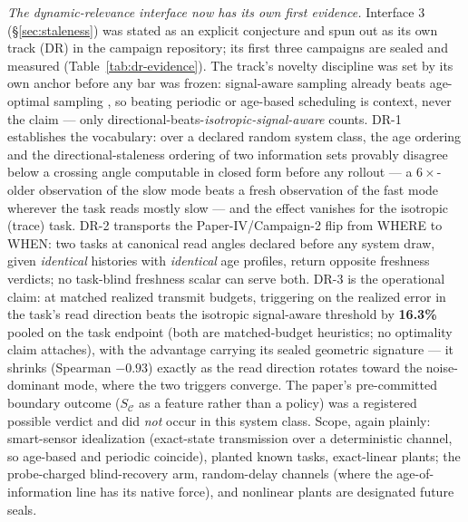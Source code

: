 \documentclass[letterpaper,onecolumn]{IEEEtran}
\theoremstyle{definition}
\theoremstyle{remark}
\newcommand{\SC}{S_{\mathcal{C}}}
\begin{document}
\emph{The dynamic-relevance interface now has its own first evidence.}
Interface 3 (\S\ref{sec:staleness}) was stated as an explicit conjecture
and spun out as its own track (DR) in the campaign repository; its first
three campaigns are sealed and measured
(Table~\ref{tab:dr-evidence}). The track's novelty discipline was set by
its own anchor before any bar was frozen: signal-aware sampling already
beats age-optimal sampling \cite{sun2020}, so beating periodic or
age-based scheduling is context, never the claim --- only
directional-beats-\emph{isotropic-signal-aware} counts. DR-1
establishes the vocabulary: over a declared random system class, the
age ordering and the directional-staleness ordering of two information
sets provably disagree below a crossing angle computable in closed form
before any rollout --- a $6\times$-older observation of the slow mode
beats a fresh observation of the fast mode wherever the task reads
mostly slow --- and the effect vanishes for the isotropic (trace)
task. DR-2 transports the Paper-IV/Campaign-2 flip from WHERE to
WHEN: two tasks at canonical read angles declared before any system
draw, given \emph{identical} histories with \emph{identical} age
profiles, return opposite freshness verdicts; no task-blind
freshness scalar can serve both. DR-3 is the operational claim: at
matched realized transmit budgets, triggering on the realized error in
the task's read direction beats the isotropic signal-aware
threshold by \textbf{16.3\%} pooled on the task endpoint (both are
matched-budget heuristics; no optimality claim attaches), with the
advantage carrying its sealed geometric signature --- it shrinks
(Spearman $-0.93$) exactly as the read direction rotates toward the
noise-dominant mode, where the two triggers converge. The paper's
pre-committed boundary outcome ($\SC$ as a feature rather than a
policy) was a registered possible verdict and did \emph{not} occur in
this system class. Scope, again plainly: smart-sensor idealization
(exact-state transmission over a deterministic channel, so age-based
and periodic coincide), planted known tasks, exact-linear plants;
the probe-charged blind-recovery arm, random-delay channels (where the
age-of-information line has its native force), and nonlinear plants are
designated future seals.
\end{document}
